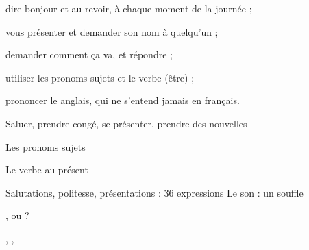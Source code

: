 
\newcommand{\otIllusUnI}{%
  \foreach \mot/\x/\y/\t/\o in {Hello!/104/86/15/0.10,Hi!/190/90/22/0.09,Hey!/122/14/13/0.08,
      Good morning/150/8/11/0.08,Welcome!/196/22/12/0.07,Bye!/100/50/12/0.07}{%
    \node[text=white,opacity=\o,font=\otBold\fontsize{\t}{\t}\selectfont,anchor=center] at (\x mm,\y mm) {\en{\mot}};}
  \fill[white,opacity=0.07] (160mm,44mm) circle (40mm);
  \otDessinAvatar{jack}{(137mm,40mm)}{15mm}{otNavyDark!70!otNavy}
  \otDessinAvatar{lea}{(182mm,47mm)}{17.5mm}{otGreen!35!otNavy}
  \otBulle{(128mm,80mm)}{south}{Hi! I'm Jack.}{white}{otNavy}{(134mm,58mm)}
  \otBulle{(181mm,84mm)}{south}{Hello! I'm Léa.}{otGreen}{white}{(181mm,67mm)}}



\begin{objectifs}
\item dire bonjour et au revoir, à chaque moment de la journée ;
\item vous présenter et demander son nom à quelqu'un ;
\item demander comment ça va, et répondre ;
\item utiliser les pronoms sujets et le verbe  (être) ;
\item prononcer le  anglais, qui ne s'entend jamais en français.
\end{objectifs}

\auprogramme
  {Saluer, prendre congé, se présenter, prendre des nouvelles}
  {Les pronoms sujets\par\vspace{0.6mm}Le verbe  au présent}
  {Salutations, politesse, présentations : 36 expressions}
  {Le son  : un souffle}
  {,  ou  ?\par\vspace{0.6mm}, , }

